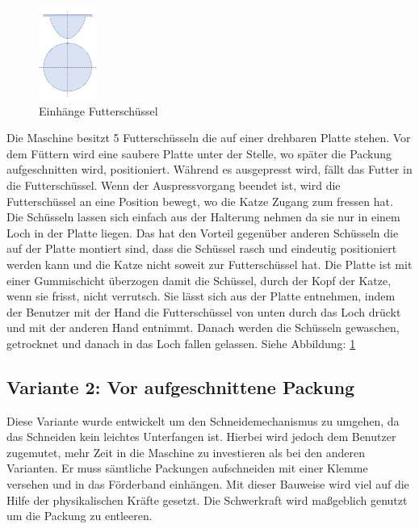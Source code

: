 \begin{figure}
\vspace{-40pt}
  \begin{center}
    \includegraphics[width=0.17\textwidth]{Bilder/Powerpoint/Loch_Futterschuessel}
  \end{center}
  \caption{Einhänge Futterschüssel}
  \label{Loch_Futterschuessel}
  \vspace{-10pt}
\end{figure}

Die Maschine besitzt 5 Futterschüsseln die auf einer drehbaren Platte stehen. Vor dem Füttern wird eine saubere Platte unter der Stelle, wo später die Packung aufgeschnitten wird, positioniert. Während es ausgepresst wird, fällt das Futter in die Futterschüssel. Wenn der Auspressvorgang beendet ist, wird die Futterschüssel an eine Position bewegt, wo die Katze Zugang zum fressen hat. Die Schüsseln lassen sich einfach aus der Halterung nehmen da sie nur in einem Loch in der Platte liegen. Das hat den Vorteil gegenüber anderen Schüsseln die auf der Platte montiert sind, dass die Schüssel rasch und eindeutig positioniert werden kann und die Katze nicht soweit zur Futterschüssel hat. Die Platte ist mit einer Gummischicht überzogen damit die Schüssel, durch der Kopf der Katze, wenn sie frisst, nicht verrutsch. Sie lässt sich aus der Platte entnehmen, indem der Benutzer mit der Hand die Futterschüssel von unten durch das Loch drückt und mit der anderen Hand entnimmt. Danach werden die Schüsseln gewaschen, getrocknet und danach in das Loch fallen gelassen. Siehe Abbildung: \ref{Loch_Futterschuessel}



\subsection{Variante 2: Vor aufgeschnittene Packung }

Diese Variante wurde entwickelt um den Schneidemechanismus zu umgehen, da das Schneiden kein leichtes Unterfangen ist. Hierbei wird jedoch dem Benutzer zugemutet, mehr Zeit in die Maschine zu investieren als bei den anderen Varianten. Er muss sämtliche Packungen aufschneiden mit einer Klemme versehen und in das Förderband einhängen. Mit dieser Bauweise wird viel auf die Hilfe der physikalischen Kräfte gesetzt. Die Schwerkraft wird maßgeblich genutzt um die Packung zu entleeren.

